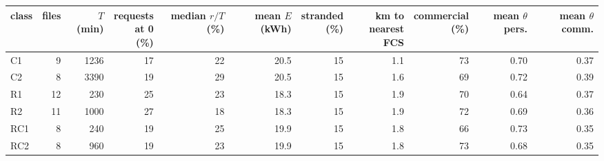 \footnotesize
\begin{adjustbox}{max width=\linewidth}
\begin{tabular}{@{}lrrrrrrrrrr@{}}
\toprule
class & files & $T$ (min) & \shortstack{requests\\at 0 (\%)} & \shortstack{median\\$r/T$ (\%)} & \shortstack{mean $E$\\(kWh)} & \shortstack{stranded\\(\%)} & \shortstack{km to\\nearest FCS} & \shortstack{commercial\\(\%)} & \shortstack{mean $\theta$\\pers.} & \shortstack{mean $\theta$\\comm.} \\
\midrule
C1 & 9 & 1236 & 17 & 22 & 20.5 & 15 & 1.1 & 73 & 0.70 & 0.37 \\
C2 & 8 & 3390 & 19 & 29 & 20.5 & 15 & 1.6 & 69 & 0.72 & 0.39 \\
R1 & 12 & 230 & 25 & 23 & 18.3 & 15 & 1.9 & 70 & 0.64 & 0.37 \\
R2 & 11 & 1000 & 27 & 18 & 18.3 & 15 & 1.9 & 72 & 0.69 & 0.36 \\
RC1 & 8 & 240 & 19 & 25 & 19.9 & 15 & 1.8 & 66 & 0.73 & 0.35 \\
RC2 & 8 & 960 & 19 & 23 & 19.9 & 15 & 1.8 & 73 & 0.68 & 0.35 \\
\bottomrule
\end{tabular}
\end{adjustbox}
